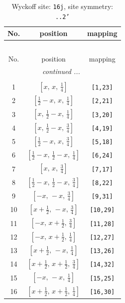 \documentclass[fleqn,8pt]{jsarticle}
\begin{document}
\renewcommand{\arraystretch}{1.2}
\begin{longtable}{ccc}
\caption{Wyckoff site: {\tt 16j}, site symmetry: {\tt ..2'}}
 \\
 \hline \hline
No. & position & mapping \\ \hline \endfirsthead

\multicolumn{2}{l}{\tablename\ \thetable{}} \\
 \hline \hline
No. & position & mapping \\ \hline \endhead

 \hline \hline
\multicolumn{2}{r}{\footnotesize\it continued ...} \\ \endfoot

 \hline \hline
\multicolumn{2}{r}{} \\ \endlastfoot

1 & $\left[ x,\, x,\, \frac{1}{4} \right]$ & {\tt [1,23]} \\ \hline
2 & $\left[ \frac{1}{2} - x,\, x,\, \frac{1}{4} \right]$ & {\tt [2,21]} \\ \hline
3 & $\left[ x,\, \frac{1}{2} - x,\, \frac{1}{4} \right]$ & {\tt [3,20]} \\ \hline
4 & $\left[ x,\, \frac{1}{2} - x,\, \frac{3}{4} \right]$ & {\tt [4,19]} \\ \hline
5 & $\left[ \frac{1}{2} - x,\, x,\, \frac{3}{4} \right]$ & {\tt [5,18]} \\ \hline
6 & $\left[ \frac{1}{2} - x,\, \frac{1}{2} - x,\, \frac{1}{4} \right]$ & {\tt [6,24]} \\ \hline
7 & $\left[ x,\, x,\, \frac{3}{4} \right]$ & {\tt [7,17]} \\ \hline
8 & $\left[ \frac{1}{2} - x,\, \frac{1}{2} - x,\, \frac{3}{4} \right]$ & {\tt [8,22]} \\ \hline
9 & $\left[ - x,\, - x,\, \frac{3}{4} \right]$ & {\tt [9,31]} \\ \hline
10 & $\left[ x + \frac{1}{2},\, - x,\, \frac{3}{4} \right]$ & {\tt [10,29]} \\ \hline
11 & $\left[ - x,\, x + \frac{1}{2},\, \frac{3}{4} \right]$ & {\tt [11,28]} \\ \hline
12 & $\left[ - x,\, x + \frac{1}{2},\, \frac{1}{4} \right]$ & {\tt [12,27]} \\ \hline
13 & $\left[ x + \frac{1}{2},\, - x,\, \frac{1}{4} \right]$ & {\tt [13,26]} \\ \hline
14 & $\left[ x + \frac{1}{2},\, x + \frac{1}{2},\, \frac{3}{4} \right]$ & {\tt [14,32]} \\ \hline
15 & $\left[ - x,\, - x,\, \frac{1}{4} \right]$ & {\tt [15,25]} \\ \hline
16 & $\left[ x + \frac{1}{2},\, x + \frac{1}{2},\, \frac{1}{4} \right]$ & {\tt [16,30]} \\
\end{longtable}
\end{document}
